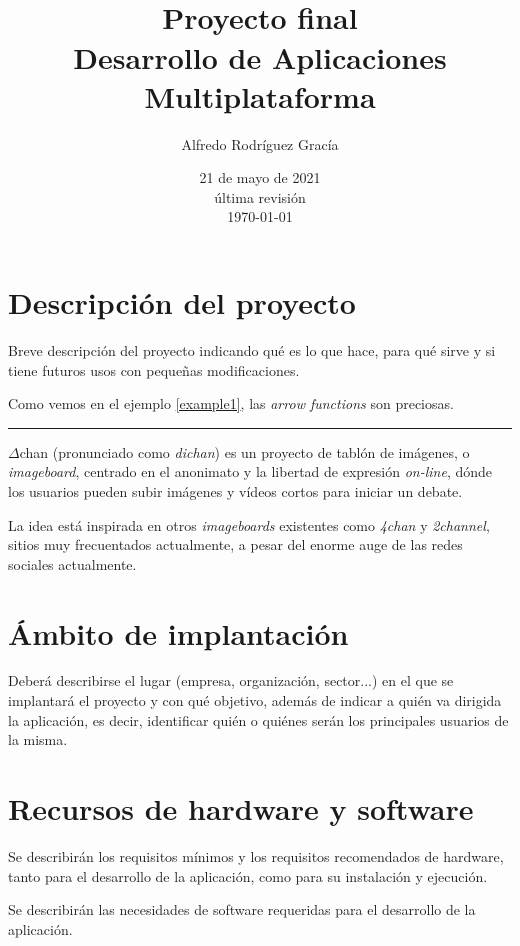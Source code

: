 \documentclass[12pt,a4paper,titlepage]{article}
\title{\Dchan\\\bigskip\normalsize{Proyecto final\\Desarrollo de Aplicaciones Multiplataforma}}
\author{Alfredo Rodríguez Gracía}
\date{21 de mayo de 2021\\\bigskip\scriptsize{última revisión\\\today}}
\newcommand\Dchan{$\Delta$chan }
\begin{document}
    \maketitle
    \tableofcontents
    \newpage

    \section{Descripción del proyecto}

    Breve descripción del proyecto indicando qué es lo que hace, para qué sirve y si tiene futuros usos con pequeñas modificaciones.

    Como vemos en el ejemplo \ref{example1}, las \emph{arrow functions} son preciosas.

    \bigskip\hrule\bigskip

    \Dchan (pronunciado como \emph{dichan}) es un proyecto de tablón de imágenes, o \emph{imageboard}\cite{wikiImageboard}, centrado en el anonimato y la libertad de expresión \emph{on-line}, dónde los usuarios pueden subir imágenes y vídeos cortos para iniciar un debate.

    La idea está inspirada en otros \emph{imageboards} existentes como \emph{4chan} y \emph{2channel}, sitios muy frecuentados actualmente, a pesar del enorme auge de las redes sociales actualmente.

    \section{Ámbito de implantación}

    Deberá describirse el lugar (empresa, organización, sector...) en el que se implantará el proyecto y con qué objetivo, además de indicar a quién va dirigida la aplicación, es decir, identificar quién o quiénes serán los principales usuarios de la misma.

    \section{Recursos de hardware y software}

    Se describirán los requisitos mínimos y los requisitos recomendados de hardware, tanto para el desarrollo de la aplicación, como para su instalación y ejecución.

    Se describirán las necesidades de software requeridas para el desarrollo de la aplicación.
\end{document}
